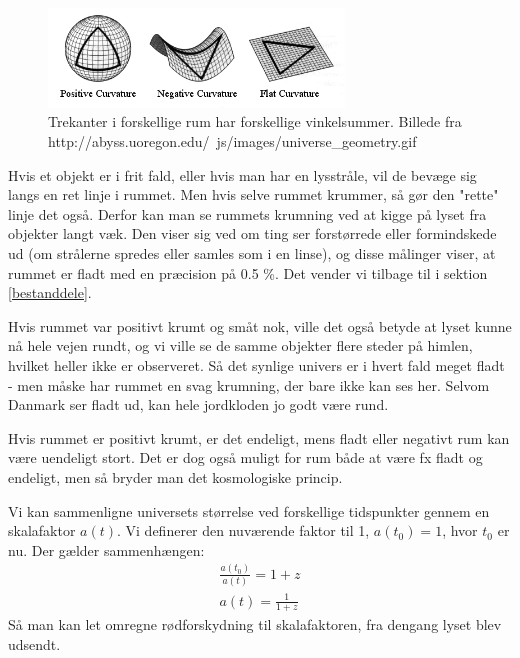 \begin{figure}[h!]
	\centering
	\includegraphics[width=0.7\textwidth]{Astrofysik/Astrofig/universe_geometry.png}
	\caption{Trekanter i forskellige rum har forskellige vinkelsummer. Billede fra http://abyss.uoregon.edu/~js/images/universe\_geometry.gif}
	\label{shapes}
\end{figure}

Hvis et objekt er i frit fald, eller hvis man har en lysstråle, vil de bevæge sig langs en ret linje i rummet. Men hvis selve rummet krummer, så gør den "rette" linje det også. Derfor kan man se rummets krumning ved at kigge på lyset fra objekter langt væk. Den viser sig ved om ting ser forstørrede eller formindskede ud (om strålerne spredes eller samles som i en linse), og disse målinger viser, at rummet er fladt med en præcision på 0.5 \%. Det vender vi tilbage til i sektion \ref{bestanddele}. %

Hvis rummet var positivt krumt og småt nok, ville det også betyde at lyset kunne nå hele vejen rundt, og vi ville se de samme objekter flere steder på himlen, hvilket heller ikke er observeret. Så det synlige univers er i hvert fald meget fladt - men måske har rummet en svag krumning, der bare ikke kan ses her. Selvom Danmark ser fladt ud, kan hele jordkloden jo godt være rund.

Hvis rummet er positivt krumt, er det endeligt, mens fladt eller negativt rum kan være uendeligt stort. Det er dog også muligt for rum både at være fx fladt og endeligt, men så bryder man det kosmologiske princip.

Vi kan sammenligne universets størrelse ved forskellige tidspunkter gennem en skalafaktor $a(t)$. Vi definerer den nuværende faktor til 1, $a(t_0)=1$, hvor $t_0$ er nu. Der gælder sammenhængen:
\begin{align}
\frac{a(t_0)}{a(t)}=1+z\\
a(t)=\frac{1}{1+z}
\end{align}
Så man kan let omregne rødforskydning til skalafaktoren, fra dengang lyset blev udsendt.

